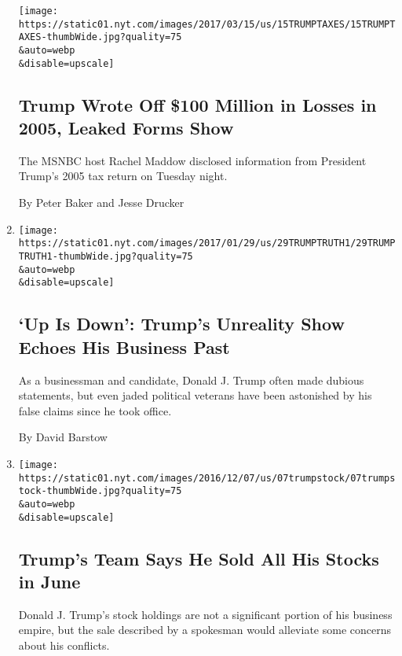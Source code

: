 \begin{enumerate}
  \texttt{[image: https://static01.nyt.com/images/2017/03/15/us/15TRUMPTAXES/15TRUMPTAXES-thumbWide.jpg?quality=75\\\&auto=webp\\\&disable=upscale]}

  \hypertarget{trump-wrote-off-100-million-in-losses-in-2005-leaked-forms-show}{%
  \subsection{Trump Wrote Off \$100 Million in Losses in 2005, Leaked
  Forms
  Show}\label{trump-wrote-off-100-million-in-losses-in-2005-leaked-forms-show}}

  The MSNBC host Rachel Maddow disclosed information from President
  Trump's 2005 tax return on Tuesday night.

  By Peter Baker and Jesse Drucker
\item
  \href{/2017/01/28/us/politics/donald-trump-truth.html}{}

  \texttt{[image: https://static01.nyt.com/images/2017/01/29/us/29TRUMPTRUTH1/29TRUMPTRUTH1-thumbWide.jpg?quality=75\\\&auto=webp\\\&disable=upscale]}

  \hypertarget{up-is-down-trumps-unreality-show-echoes-his-business-past}{%
  \subsection{`Up Is Down': Trump's Unreality Show Echoes His Business
  Past}\label{up-is-down-trumps-unreality-show-echoes-his-business-past}}

  As a businessman and candidate, Donald J. Trump often made dubious
  statements, but even jaded political veterans have been astonished by
  his false claims since he took office.

  By David Barstow
\item
  \href{/2016/12/06/us/politics/donald-trump-business-stocks.html}{}

  \texttt{[image: https://static01.nyt.com/images/2016/12/07/us/07trumpstock/07trumpstock-thumbWide.jpg?quality=75\\\&auto=webp\\\&disable=upscale]}

  \hypertarget{trumps-team-says-he-sold-all-his-stocks-in-june}{%
  \subsection{Trump's Team Says He Sold All His Stocks in
  June}\label{trumps-team-says-he-sold-all-his-stocks-in-june}}

  Donald J. Trump's stock holdings are not a significant portion of his
  business empire, but the sale described by a spokesman would alleviate
  some concerns about his conflicts.


\end{enumerate}
